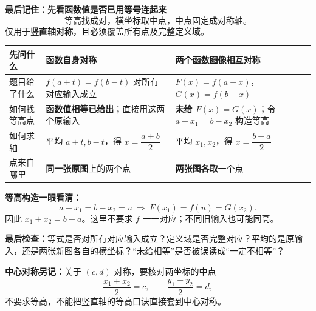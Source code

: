 \clearpage
\begin{summarybox}
\textbf{最后记住：先看函数值是否已用等号连起来}
\[\boxed{\text{等高找成对，横坐标取中点，中点固定成对称轴。}}\]
仅用于\textbf{竖直轴对称}，且必须覆盖所有点及完整定义域。

\begin{center}\renewcommand{\arraystretch}{1.6}
\begin{tabular}{p{.18\linewidth}|p{.34\linewidth}|p{.34\linewidth}}
先问什么 & 函数自身对称 & 两个函数图像相互对称\\\hline
题目给了什么 & $f(a+t)=f(b-t)$ 对所有对应输入成立 & $F(x)=f(a+x)$，\newline $G(x)=f(b-x)$\\
如何找等高点 & \textbf{函数值相等已给出}；直接用这两个原输入 & \textbf{未给 $F(x)=G(x)$}；\newline 令 $a+x_1=b-x_2$ 构造等高\\
如何求轴 & 平均 $a+t,b-t$，得 $x=\dfrac{a+b}{2}$ & 平均 $x_1,x_2$，得 $x=\dfrac{b-a}{2}$\\
点来自哪里 & \textbf{同一张原图}上的两个点 & \textbf{两张图各取}一个点
\end{tabular}\end{center}

\textbf{等高构造一眼看清：}
\[a+x_1=b-x_2=u\ \Longrightarrow\ F(x_1)=f(u)=G(x_2).\]
因此 $x_1+x_2=b-a$。这里不要求 $f$ 一一对应；不同旧输入也可能同高。

\textbf{最后检查：}等式是否对所有对应输入成立？定义域是否完整对应？平均的是原输入，还是两张新图各自的横坐标？“未给相等”是否被误读成“一定不相等”？

\textbf{中心对称另记：}关于 $(c,d)$ 对称，要核对两坐标的中点
\[\frac{x_1+x_2}{2}=c,\qquad \frac{y_1+y_2}{2}=d,\]
不要求等高，不能把竖直轴的等高口诀直接套到中心对称。
\end{summarybox}
